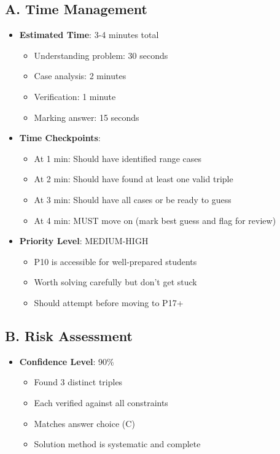 \documentclass[11pt]{article}
\begin{document}
\begin{competitionbox}
\subsection*{A. Time Management}
\begin{itemize}[leftmargin=*]
    \item \textbf{Estimated Time}: 3-4 minutes total
    \begin{itemize}
        \item Understanding problem: 30 seconds
        \item Case analysis: 2 minutes
        \item Verification: 1 minute
        \item Marking answer: 15 seconds
    \end{itemize}
    
    \item \textbf{Time Checkpoints}: 
    \begin{itemize}
        \item At 1 min: Should have identified range cases
        \item At 2 min: Should have found at least one valid triple
        \item At 3 min: Should have all cases or be ready to guess
        \item At 4 min: MUST move on (mark best guess and flag for review)
    \end{itemize}
    
    \item \textbf{Priority Level}: MEDIUM-HIGH
    \begin{itemize}
        \item P10 is accessible for well-prepared students
        \item Worth solving carefully but don't get stuck
        \item Should attempt before moving to P17+
    \end{itemize}
\end{itemize}

\subsection*{B. Risk Assessment}
\begin{itemize}[leftmargin=*]
    \item \textbf{Confidence Level}: 90\%
    \begin{itemize}
        \item Found 3 distinct triples
        \item Each verified against all constraints
        \item Matches answer choice (C)
        \item Solution method is systematic and complete
    \end{itemize}
    

\end{itemize}
\end{competitionbox}
\end{document}
